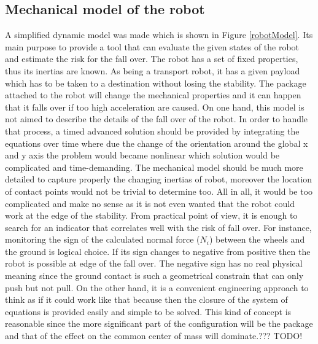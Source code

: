 \documentclass[12pt,english]{article}
\begin{document}
\subsection{Mechanical model of the robot}
A simplified dynamic model was made which is shown in Figure \ref{robotModel}. Its main purpose to provide a tool that can evaluate the given states of the robot and estimate the risk for the fall over. The robot has a set of fixed properties, thus its inertias are known. As being a transport robot, it has a given payload which has to be taken to a destination without losing the stability. The package attached to the robot will change the mechanical properties and it can happen that it falls over if too high acceleration are caused. On one hand, this model is not aimed to describe the details of the fall over of the robot. In order to handle that process, a timed advanced solution should be provided by integrating the equations over time where due the change of the orientation around the global x and y axis the problem would became nonlinear which solution would be complicated and time-demanding. The mechanical model should be much more detailed to capture properly the changing inertias of robot, moreover the location of contact points would not be trivial to determine too. All in all, it would be too complicated and make no sense as it is not even wanted that the robot could work at the edge of the stability. From practical point of view, it is enough to search for an indicator that correlates well with the risk of fall over. For instance, monitoring the sign of the calculated normal force ($N_i$) between the wheels and the ground is logical choice. If its sign changes to negative from positive then the robot is possible at edge of the fall over. The negative sign has no real physical meaning since the ground contact is such a geometrical constrain that can only push but not pull. On the other hand, it is a convenient engineering approach to think as if it could work like that because then the closure of the system of equations is provided easily and simple to be solved.
This kind of concept is reasonable since the more significant part of the configuration will be the package and that of the effect on the common center of mass will dominate.??? TODO!
\end{document}
